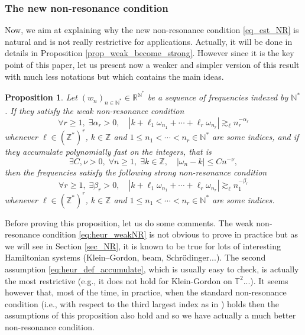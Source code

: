 \documentclass[11pt]{article}
\newcommand{\ie}{i.e.,\xspace}
\newcommand{\eg}{e.g.,\xspace}
\newtheorem{proposition}[theorem]{Proposition}
\theoremstyle{definition}
\begin{document}
\subsubsection*{The new non-resonance condition}
Now, we aim at explaining why the new non-resonance condition \eqref{eq_est_NR} is natural and is not really restrictive for applications. Actually, it will be done in details in Proposition \ref{prop_weak_become_strong}. However since it is the key point of this paper, let us present now a weaker and simpler version of this result with much less notations but which contains the main ideas.
\begin{proposition} \label{prop:heur_SD} Let $(w_n)_{n\in \mathbb{N}^*} \in \mathbb{R}^{\mathbb{N}^*}$ be a sequence of frequencies indexed by $\mathbb{N}^*$. If they satisfy the weak non-resonance condition
\begin{equation}
\label{eq:heur_weakNR}
\forall r\geq 1,\; \exists \alpha_r >0, \quad |k+\ell_1 \omega_{n_1} + \cdots + \ell_r \omega_{n_r}| \gtrsim_\ell n_r^{-\alpha_r}
\end{equation}
whenever $\ell \in (\mathbb{Z}^*)^r$, $k \in \mathbb{Z}$ and $1\leq n_1< \cdots < n_r \in \mathbb{N}^*$ are some indices, and if they accumulate polynomially fast on the integers, that is
\begin{equation}
\label{eq:heur_def_accumulate}
\exists C,\nu >0,\;\forall n \geq 1,\; \exists k \in \mathbb{Z}, \quad |\omega_n - k | \leq C n^{-\nu},
\end{equation}
then the frequencies satisfy the following strong non-resonance condition
\begin{equation}
\label{eq:heur_strongNR}
\forall r\geq 1,\; \exists \beta_r >0, \quad |k+\ell_1 \omega_{n_1} + \cdots + \ell_r \omega_{n_r}| \gtrsim_\ell n_1^{-\beta_r}
\end{equation}
whenever $\ell \in (\mathbb{Z}^*)^r$, $k \in \mathbb{Z}$ and $1\leq n_1< \cdots < n_r \in \mathbb{N}^*$ are some indices.
\end{proposition}
Before proving this proposition, let us do some comments. The weak non-resonance condition \eqref{eq:heur_weakNR} is not obvious to prove in practice but as we will see in Section \ref{sec_NR}, it is known to be true for lots of interesting Hamiltonian systems (Klein--Gordon, beam, Schrödinger...). The second assumption \eqref{eq:heur_def_accumulate}, which is usually easy to check, is actually the most restrictive (\eg it does not hold for Klein-Gordon on $\mathbb{T}^2$...). It seems however that, most of the time, in practice, when the standard non-resonance condition (\ie with respect to the third largest index as in \cite{Bam03}) holds then the assumptions of this proposition also hold and so we have actually a much better non-resonance condition.
\end{document}
